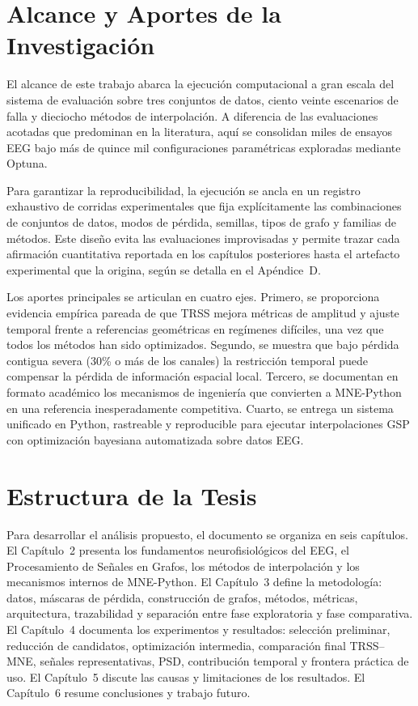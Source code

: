 \section{Alcance y Aportes de la Investigación}

El alcance de este trabajo abarca la ejecución computacional a gran escala del sistema de evaluación sobre tres conjuntos de datos, ciento veinte escenarios de falla y dieciocho métodos de interpolación. A diferencia de las evaluaciones acotadas que predominan en la literatura, aquí se consolidan miles de ensayos EEG bajo más de quince mil configuraciones paramétricas exploradas mediante Optuna.

Para garantizar la reproducibilidad, la ejecución se ancla en un registro exhaustivo de corridas experimentales que fija explícitamente las combinaciones de conjuntos de datos, modos de pérdida, semillas, tipos de grafo y familias de métodos. Este diseño evita las evaluaciones improvisadas y permite trazar cada afirmación cuantitativa reportada en los capítulos posteriores hasta el artefacto experimental que la origina, según se detalla en el Apéndice~D.

Los aportes principales se articulan en cuatro ejes. Primero, se proporciona evidencia empírica pareada de que TRSS mejora métricas de amplitud y ajuste temporal frente a referencias geométricas en regímenes difíciles, una vez que todos los métodos han sido optimizados. Segundo, se muestra que bajo pérdida contigua severa (30\% o más de los canales) la restricción temporal puede compensar la pérdida de información espacial local. Tercero, se documentan en formato académico los mecanismos de ingeniería que convierten a MNE-Python en una referencia inesperadamente competitiva. Cuarto, se entrega un sistema unificado en Python, rastreable y reproducible para ejecutar interpolaciones GSP con optimización bayesiana automatizada sobre datos EEG.

\section{Estructura de la Tesis}

Para desarrollar el análisis propuesto, el documento se organiza en seis capítulos. El Capítulo~2 presenta los fundamentos neurofisiológicos del EEG, el Procesamiento de Señales en Grafos, los métodos de interpolación y los mecanismos internos de MNE-Python. El Capítulo~3 define la metodología: datos, máscaras de pérdida, construcción de grafos, métodos, métricas, arquitectura, trazabilidad y separación entre fase exploratoria y fase comparativa. El Capítulo~4 documenta los experimentos y resultados: selección preliminar, reducción de candidatos, optimización intermedia, comparación final TRSS--MNE, señales representativas, PSD, contribución temporal y frontera práctica de uso. El Capítulo~5 discute las causas y limitaciones de los resultados. El Capítulo~6 resume conclusiones y trabajo futuro.

